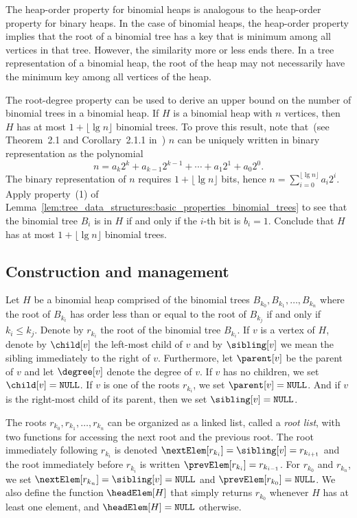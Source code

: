 The heap-order property for
binomial heaps is analogous to the heap-order property for binary
heaps. In the case of binomial heaps, the heap-order property implies
that the root of a binomial tree has a key that is minimum among all
vertices in that tree. However, the similarity more or less ends
there. In a tree representation of a binomial heap, the root of the
heap may not necessarily have the minimum key among all vertices of
the heap.

The root-degree property can
be used to derive an upper bound on the number of binomial trees in a
binomial heap. If $H$ is a binomial heap with $n$ vertices, then $H$
has at most $1 + \lfloor \lg n \rfloor$ binomial trees. To prove this
result, note that~(see Theorem~2.1 and Corollary~2.1.1
in~\cite[pp.40--42]{Rosen2000}) $n$ can be uniquely written in binary
representation as the polynomial
\[
n
=
a_k 2^k + a_{k-1} 2^{k-1} + \cdots + a_1 2^1 + a_0 2^0.
\]
The binary representation of $n$ requires $1 + \lfloor \lg n \rfloor$
bits, hence $n = \sum_{i=0}^{\lfloor \lg n \rfloor} a_i 2^i$. Apply
property~(1) of
Lemma~\ref{lem:tree_data_structures:basic_properties_binomial_trees}
to see that the binomial tree $B_i$ is in $H$ if and only if the
$i$-th bit is $b_i = 1$. Conclude that $H$ has at most
$1 + \lfloor \lg n \rfloor$ binomial trees.



\subsection{Construction and management}

Let $H$ be a binomial heap comprised of the binomial trees
$B_{k_0}, B_{k_1}, \dots, B_{k_n}$ where the root of $B_{k_i}$ has
order less than or equal to the root of $B_{k_j}$ if and only if
$k_i \leq k_j$. Denote by $r_{k_i}$ the root of the binomial tree
$B_{k_i}$. If $v$ is a vertex of $H$, denote by $\child[v]$ the
left-most child of $v$ and by $\sibling[v]$ we mean the sibling
immediately to the right of $v$. Furthermore, let $\parent[v]$ be the
parent of $v$ and let $\degree[v]$ denote the degree of $v$. If $v$
has no children, we set $\child[v] = \texttt{NULL}$. If $v$ is one of
the roots $r_{k_i}$, we set $\parent[v] = \texttt{NULL}$. And if $v$
is the right-most child of its parent, then we set
$\sibling[v] = \texttt{NULL}$.

The roots $r_{k_0}, r_{k_1}, \dots, r_{k_n}$ can be organized as a
linked list, called a \emph{root list}, with two
functions for accessing the next root and the previous root. The root
immediately following $r_{k_i}$ is denoted
$\nextElem[r_{k_i}] = \sibling[v] = r_{k_{i+1}}$ and the root
immediately before $r_{k_i}$ is written
$\prevElem[r_{k_i}] = r_{k_{i-1}}$. For $r_{k_0}$ and $r_{k_n}$, we
set $\nextElem[r_{k_n}] = \sibling[v] = \texttt{NULL}$ and
$\prevElem[r_{k_0}] = \texttt{NULL}$. We also define the function
$\headElem[H]$ that simply returns $r_{k_0}$ whenever $H$ has at least
one element, and $\headElem[H] = \texttt{NULL}$ otherwise.


